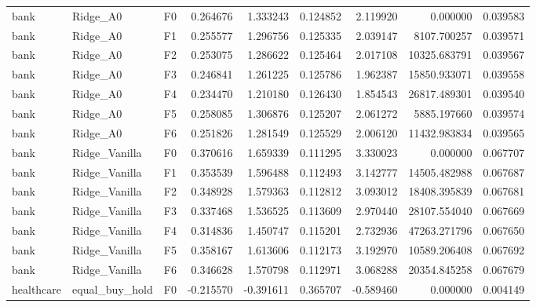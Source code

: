 \begin{tabular}{lllrrrrrr}
      bank &                     Ridge\_A0 &  F0 &  0.264676 &  1.333243 & 0.124852 &  2.119920 &         0.000000 &             0.039583 \\
      bank &                     Ridge\_A0 &  F1 &  0.255577 &  1.296756 & 0.125335 &  2.039147 &      8107.700257 &             0.039571 \\
      bank &                     Ridge\_A0 &  F2 &  0.253075 &  1.286622 & 0.125464 &  2.017108 &     10325.683791 &             0.039567 \\
      bank &                     Ridge\_A0 &  F3 &  0.246841 &  1.261225 & 0.125786 &  1.962387 &     15850.933071 &             0.039558 \\
      bank &                     Ridge\_A0 &  F4 &  0.234470 &  1.210180 & 0.126430 &  1.854543 &     26817.489301 &             0.039540 \\
      bank &                     Ridge\_A0 &  F5 &  0.258085 &  1.306876 & 0.125207 &  2.061272 &      5885.197660 &             0.039574 \\
      bank &                     Ridge\_A0 &  F6 &  0.251826 &  1.281549 & 0.125529 &  2.006120 &     11432.983834 &             0.039565 \\
      bank &                Ridge\_Vanilla &  F0 &  0.370616 &  1.659339 & 0.111295 &  3.330023 &         0.000000 &             0.067707 \\
      bank &                Ridge\_Vanilla &  F1 &  0.353539 &  1.596488 & 0.112493 &  3.142777 &     14505.482988 &             0.067687 \\
      bank &                Ridge\_Vanilla &  F2 &  0.348928 &  1.579363 & 0.112812 &  3.093012 &     18408.395839 &             0.067681 \\
      bank &                Ridge\_Vanilla &  F3 &  0.337468 &  1.536525 & 0.113609 &  2.970440 &     28107.554040 &             0.067669 \\
      bank &                Ridge\_Vanilla &  F4 &  0.314836 &  1.450747 & 0.115201 &  2.732936 &     47263.271796 &             0.067650 \\
      bank &                Ridge\_Vanilla &  F5 &  0.358167 &  1.613606 & 0.112173 &  3.192970 &     10589.206408 &             0.067692 \\
      bank &                Ridge\_Vanilla &  F6 &  0.346628 &  1.570798 & 0.112971 &  3.068288 &     20354.845258 &             0.067679 \\
healthcare &               equal\_buy\_hold &  F0 & -0.215570 & -0.391611 & 0.365707 & -0.589460 &         0.000000 &             0.004149 \\

\end{tabular}
